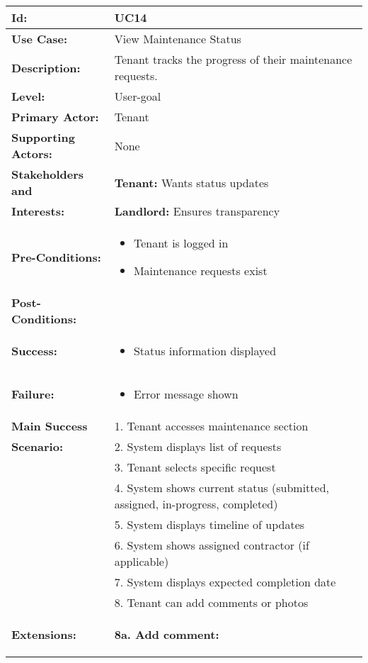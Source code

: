 \documentclass[12pt]{article}
\begin{document}
\begin{longtable}{|p{3cm}|p{11cm}|}
\hline
\textbf{Id:} & UC14 \\
\hline
\textbf{Use Case:} & View Maintenance Status \\
\hline
\textbf{Description:} & Tenant tracks the progress of their maintenance requests. \\
\hline
\textbf{Level:} & User-goal \\
\hline
\textbf{Primary Actor:} & Tenant \\
\hline
\textbf{Supporting Actors:} & None \\
\hline
\textbf{Stakeholders and} & \textbf{Tenant:} Wants status updates \\
\textbf{Interests:} & \textbf{Landlord:} Ensures transparency \\
\hline
\textbf{Pre-Conditions:} & 
\begin{itemize}
    \item Tenant is logged in
    \item Maintenance requests exist
\end{itemize} \\
\hline
\textbf{Post-Conditions:} & \\
\textbf{Success:} & 
\begin{itemize}
    \item Status information displayed
\end{itemize} \\
\textbf{Failure:} & 
\begin{itemize}
    \item Error message shown
\end{itemize} \\
\hline
\textbf{Main Success} & 1. Tenant accesses maintenance section \\
\textbf{Scenario:} & 2. System displays list of requests \\
& 3. Tenant selects specific request \\
& 4. System shows current status (submitted, assigned, in-progress, completed) \\
& 5. System displays timeline of updates \\
& 6. System shows assigned contractor (if applicable) \\
& 7. System displays expected completion date \\
& 8. Tenant can add comments or photos \\
\hline
\textbf{Extensions:} & 
\textbf{8a. Add comment:}
\begin{itemize}

\end{itemize}
\end{longtable}
\end{document}
